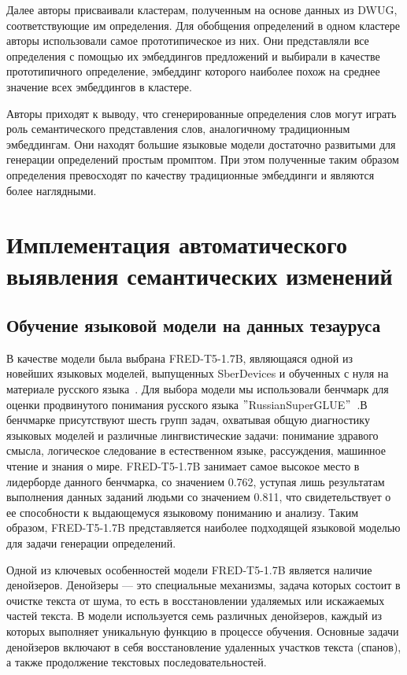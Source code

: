 \documentclass[LI,VKR]{HSEUniversity}
\begin{document}
Далее авторы присваивали кластерам, полученным на основе данных из DWUG,
соответствующие им определения.
Для обобщения определений в одном кластере авторы использовали самое прототипическое из них.
Они представляли все определения с помощью их эмбеддингов предложений и выбирали в качестве
прототипичного определение, эмбеддинг которого наиболее похож на среднее значение всех
эмбеддингов в кластере.

Авторы приходят к выводу, что сгенерированные определения слов могут играть роль
семантического представления слов, аналогичному традиционным эмбеддингам.
Они находят большие языковые модели достаточно развитыми для генерации определений
простым промптом.
При этом полученные таким образом определения превосходят по качеству
традиционные эмбеддинги и являются более наглядными.

\chapter{Имплементация автоматического выявления семантических изменений}

\section{Обучение языковой модели на данных тезауруса}

В качестве модели была выбрана FRED-T5-1.7B, являющаяся одной из новейших языковых моделей,
выпущенных SberDevices и обученных с нуля на материале русского языка~\cite{FRED-T5}.
Для выбора модели мы использовали бенчмарк для оценки продвинутого понимания русского языка
\("\)RussianSuperGLUE\("\)~\cite{RussianSuperGLUE}.В бенчмарке присутствуют шесть групп задач, охватывая
общую диагностику языковых моделей и различные лингвистические задачи: понимание здравого смысла, логическое
следование в естественном языке, рассуждения, машинное чтение и знания о мире.
FRED-T5-1.7B занимает самое высокое место в лидерборде данного бенчмарка, со значением 0.762,
уступая лишь результатам выполнения данных заданий людьми со значением 0.811,
что свидетельствует о ее способности к выдающемуся языковому пониманию и анализу.
Таким образом, FRED-T5-1.7B представляется наиболее подходящей языковой моделью
для задачи генерации определений.

Одной из ключевых особенностей модели FRED-T5-1.7B является наличие денойзеров.
Денойзеры — это специальные механизмы, задача которых состоит в очистке текста от шума,
то есть в восстановлении удаляемых или искажаемых частей текста.
В модели используется семь различных денойзеров, каждый из которых выполняет
уникальную функцию в процессе обучения.
Основные задачи денойзеров включают в себя восстановление
удаленных участков текста (спанов), а также продолжение текстовых последовательностей.
\end{document}
